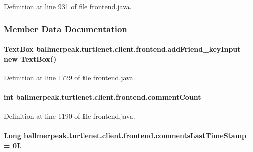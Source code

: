 Definition at line 931 of file frontend.\-java.



\subsubsection{Member Data Documentation}
\hypertarget{classballmerpeak_1_1turtlenet_1_1client_1_1frontend_ac072bb18cdb345b4d25181ed105b4468}{
\paragraph[{add\-Friend\-\_\-key\-Input}]{\setlength{\rightskip}{0pt plus 5cm}Text\-Box ballmerpeak.\-turtlenet.\-client.\-frontend.\-add\-Friend\-\_\-key\-Input = new Text\-Box()\hspace{0.3cm}{\ttfamily [package]}}}\label{classballmerpeak_1_1turtlenet_1_1client_1_1frontend_ac072bb18cdb345b4d25181ed105b4468}


Definition at line 1729 of file frontend.\-java.

\hypertarget{classballmerpeak_1_1turtlenet_1_1client_1_1frontend_acabb927a2716d2523f33d8055a608a7c}{
\paragraph[{comment\-Count}]{\setlength{\rightskip}{0pt plus 5cm}int ballmerpeak.\-turtlenet.\-client.\-frontend.\-comment\-Count\hspace{0.3cm}{\ttfamily [private]}}}\label{classballmerpeak_1_1turtlenet_1_1client_1_1frontend_acabb927a2716d2523f33d8055a608a7c}


Definition at line 1190 of file frontend.\-java.

\hypertarget{classballmerpeak_1_1turtlenet_1_1client_1_1frontend_a7a4a64b5a06ff541b6a7112f852833b3}{
\paragraph[{comments\-Last\-Time\-Stamp}]{\setlength{\rightskip}{0pt plus 5cm}Long ballmerpeak.\-turtlenet.\-client.\-frontend.\-comments\-Last\-Time\-Stamp = 0\-L\hspace{0.3cm}{\ttfamily [package]}}}\label{classballmerpeak_1_1turtlenet_1_1client_1_1frontend_a7a4a64b5a06ff541b6a7112f852833b3}


